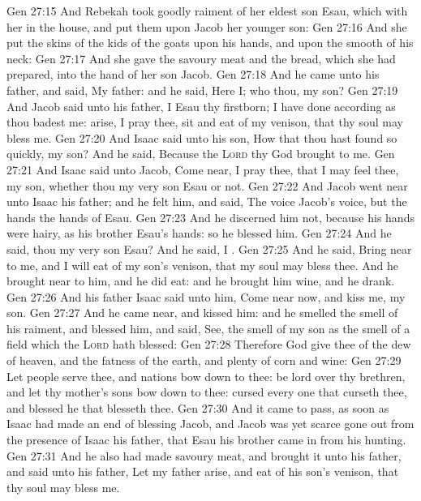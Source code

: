\vs Gen 27:15 And Rebekah took goodly raiment of her eldest son Esau, which  with her in the house, and put them upon Jacob her younger son:
\vs Gen 27:16 And she put the skins of the kids of the goats upon his hands, and upon the smooth of his neck:
\vs Gen 27:17 And she gave the savoury meat and the bread, which she had prepared, into the hand of her son Jacob.
\vs Gen 27:18 And he came unto his father, and said, My father: and he said, Here  I; who  thou, my son?
\vs Gen 27:19 And Jacob said unto his father, I  Esau thy firstborn; I have done according as thou badest me: arise, I pray thee, sit and eat of my venison, that thy soul may bless me.
\vs Gen 27:20 And Isaac said unto his son, How  that thou hast found  so quickly, my son? And he said, Because the \textsc{Lord} thy God brought  to me.
\vs Gen 27:21 And Isaac said unto Jacob, Come near, I pray thee, that I may feel thee, my son, whether thou  my very son Esau or not.
\vs Gen 27:22 And Jacob went near unto Isaac his father; and he felt him, and said, The voice  Jacob's voice, but the hands  the hands of Esau.
\vs Gen 27:23 And he discerned him not, because his hands were hairy, as his brother Esau's hands: so he blessed him.
\vs Gen 27:24 And he said,  thou my very son Esau? And he said, I .
\vs Gen 27:25 And he said, Bring  near to me, and I will eat of my son's venison, that my soul may bless thee. And he brought  near to him, and he did eat: and he brought him wine, and he drank.
\vs Gen 27:26 And his father Isaac said unto him, Come near now, and kiss me, my son.
\vs Gen 27:27 And he came near, and kissed him: and he smelled the smell of his raiment, and blessed him, and said, See, the smell of my son  as the smell of a field which the \textsc{Lord} hath blessed:
\vs Gen 27:28 Therefore God give thee of the dew of heaven, and the fatness of the earth, and plenty of corn and wine:
\vs Gen 27:29 Let people serve thee, and nations bow down to thee: be lord over thy brethren, and let thy mother's sons bow down to thee: cursed  every one that curseth thee, and blessed  he that blesseth thee.
\vs Gen 27:30 And it came to pass, as soon as Isaac had made an end of blessing Jacob, and Jacob was yet scarce gone out from the presence of Isaac his father, that Esau his brother came in from his hunting.
\vs Gen 27:31 And he also had made savoury meat, and brought it unto his father, and said unto his father, Let my father arise, and eat of his son's venison, that thy soul may bless me.
